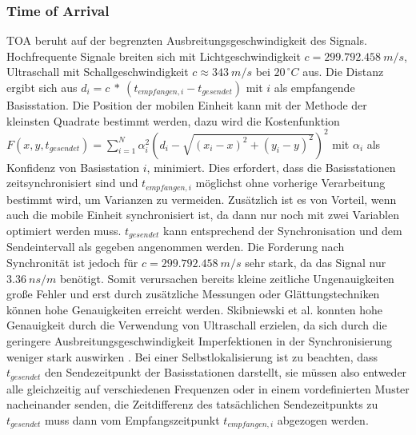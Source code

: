 \subsubsection{Time of Arrival}
TOA beruht auf der begrenzten Ausbreitungsgeschwindigkeit des Signals.
Hochfrequente Signale breiten sich mit Lichtgeschwindigkeit $c = 299.792.458\ m/s$, Ultraschall mit Schallgeschwindigkeit $c \approx 343\ m/s$ bei $20^{\ \circ}C$ aus. 
Die Distanz ergibt sich aus $d_i = c\ *\ (t_{empfangen,i} - t_{gesendet})$ mit $i$ als empfangende Basisstation.
Die Position der mobilen Einheit kann mit der Methode der kleinsten Quadrate bestimmt werden, dazu wird die Kostenfunktion $F(x,y,t_{gesendet}) = \sum_{i=1}^{N} {\alpha}^2_i (d_i - \sqrt{(x_i - x)^2 + (y_i - y)^2})^2$ mit ${\alpha}_i$ als Konfidenz von Basisstation $i$, minimiert. Dies erfordert, dass die Basisstationen zeitsynchronisiert sind und $t_{empfangen,i}$ möglichst ohne vorherige Verarbeitung bestimmt wird, um Varianzen zu vermeiden. Zusätzlich ist es von Vorteil, wenn auch die mobile Einheit synchronisiert ist, da dann nur noch mit zwei Variablen optimiert werden muss. 
$t_{gesendet}$ kann entsprechend der Synchronisation und dem Sendeintervall als gegeben angenommen werden. 
Die Forderung nach Synchronität ist jedoch für $c = 299.792.458\ m/s$ sehr stark, da das Signal nur $3.36\ ns/m$ benötigt. 
Somit verursachen bereits kleine zeitliche Ungenauigkeiten große Fehler und erst durch zusätzliche Messungen oder Glättungstechniken können hohe Genauigkeiten erreicht werden. 
Skibniewski et al. konnten hohe Genauigkeit durch die Verwendung von Ultraschall erzielen, da sich durch die geringere Ausbreitungsgeschwindigkeit Imperfektionen in der Synchronisierung weniger stark auswirken \cite{skibniewski2009simulation}. 
Bei einer Selbstlokalisierung ist zu beachten, dass $t_{gesendet}$ den Sendezeitpunkt der Basisstationen darstellt, sie müssen also entweder alle gleichzeitig auf verschiedenen Frequenzen oder in einem vordefinierten Muster nacheinander senden, die Zeitdifferenz des tatsächlichen Sendezeitpunkts zu $t_{gesendet}$ muss dann vom Empfangszeitpunkt $t_{empfangen,i}$ abgezogen werden. 


